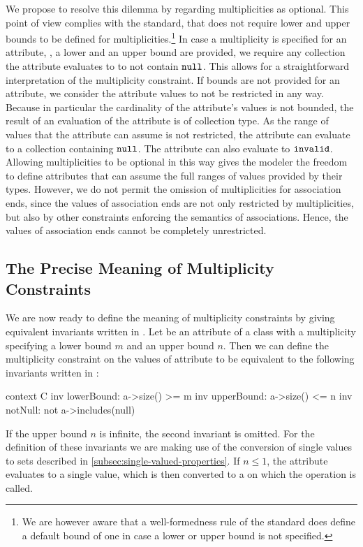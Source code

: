 We propose to resolve this dilemma by regarding multiplicities as optional. This
point of view complies with the \UML standard, that does not require lower and
upper bounds to be defined for multiplicities.\footnote{We are however aware
  that a well-formedness rule of the \UML standard does define a default bound
  of one in case a lower or upper bound is not specified.} In case a
multiplicity is specified for an attribute, \ie, a lower and an upper bound
are provided, we require any collection the attribute evaluates to to not
contain $\mathtt{null}$. This allows for a straightforward interpretation of
the multiplicity constraint. If bounds are not provided for an attribute, we
consider the attribute values to not be restricted in any way. Because in
particular the cardinality of the attribute's values is not bounded, the result
of an evaluation of the attribute is of collection type. As the range of values
that the attribute can assume is not restricted, the attribute can evaluate to a
collection containing $\mathtt{null}$. The attribute can also evaluate to
$\mathtt{invalid}$. Allowing multiplicities to be optional in this way gives
the modeler the freedom to define attributes that can assume the full ranges of
values provided by their types. However, we do not permit the omission of
multiplicities for association ends, since the values of association ends are
not only restricted by multiplicities, but also by other constraints enforcing
the semantics of associations. Hence, the values of association ends cannot be
completely unrestricted.

\subsection{The Precise Meaning of Multiplicity Constraints}
We are now ready to define the meaning of multiplicity constraints by giving
equivalent invariants written in \OCL. Let  be an attribute of a
class  with a multiplicity specifying a lower bound $m$ and an
upper bound $n$. Then we can define the multiplicity constraint on the values of
attribute  to be equivalent to the following invariants written in
\OCL:
\begin{ocl}
context C inv lowerBound: a->size() >= m
          inv upperBound: a->size() <= n
          inv notNull: not a->includes(null)
\end{ocl}
If the upper bound $n$ is infinite, the second invariant is omitted. For the
definition of these invariants we are making use of the conversion of single
values to sets described in \autoref{subsec:single-valued-properties}. If $n
\leq 1$, the attribute  evaluates to a single value, which is then
converted to a  on which the  operation is
called.


